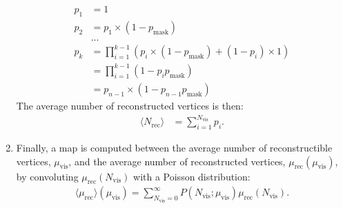 \begin{enumerate}
	\begin{align}
		p_1 &= 1\\
		p_2 &= p_1 \times (1 - p_{\textrm{mask}})\\
		&... \\
		p_k &= \prod_{i=1}^{k-1} \left( p_i  \times (1-p_{\textrm{mask}}) + (1-p_i) \times 1\right)\\
		&= \prod_{i=1}^{k-1} \left(1 - p_i p_{\textrm{mask}}\right)\\
		&= p_{n-1} \times \left(1-p_{n-1} p_{\textrm{mask}}\right)
	\end{align}
	The average number of reconstructed vertices is then:
	\begin{align}
		\langle N_{\textrm{rec}} \rangle &= \sum_{i=1}^{N_{\textrm{vis}}} p_i.
	\end{align}
	
	\item Finally, a map is computed between the average number of reconstructible vertices, $\mu_{\textrm{vis}}$, and the average number of reconstructed vertices, $ \mu_{\textrm{rec}}(\mu_{\textrm{vis}})$, by convoluting $\mu_{\textrm{rec}}(N_{\textrm{vis}})$ with a Poisson distribution:
	\begin{align}
		\langle \mu_{\textrm{rec}} \rangle (\mu_{\textrm{vis}}) = \sum_{N_{\textrm{vis}}=0}^{\infty} P(N_{\textrm{vis}}; \mu_{\textrm{vis}}) \mu_{\textrm{rec}} (N_{\textrm{vis}}).
	\end{align}
\end{enumerate}

